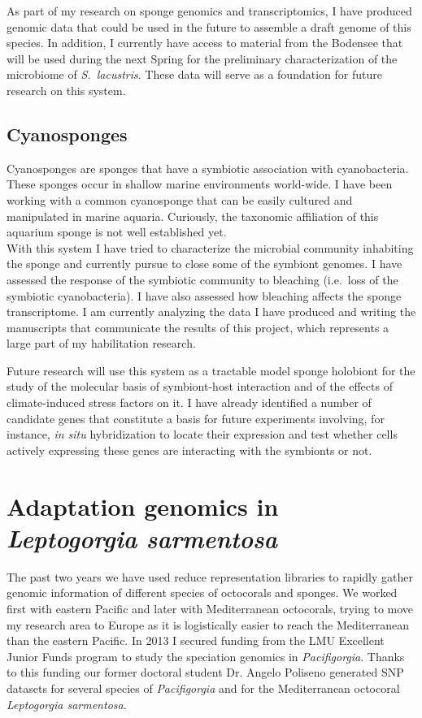 \documentclass[a4paper,11pt]{article}
\begin{document}
As part of my research on sponge genomics and transcriptomics, I have produced genomic data that could be used in the future to assemble a draft genome of this species. In addition, I currently have access to material from the Bodensee that will be used during the next Spring for the preliminary characterization of the microbiome of \emph{S.~lacustris}. These data will serve as a foundation for future research on this system.

\subsection*{Cyanosponges}

Cyanosponges are sponges that have a symbiotic association with cyanobacteria. These sponges occur in shallow marine environments world-wide. I have been working with a common cyanosponge that can be easily cultured and manipulated in marine aquaria. Curiously, the taxonomic affiliation of this aquarium sponge is not well established yet.\\

With this system I have tried to characterize the microbial community inhabiting the sponge and currently pursue to close some of the symbiont genomes. I have assessed the response of the symbiotic community to bleaching (i.e.~loss of the symbiotic cyanobacteria). I have also assessed how bleaching affects the sponge transcriptome. I am currently analyzing the data I have produced and writing the manuscripts that communicate the results of this project, which represents a large part of my habilitation research.

Future research will use this system as a tractable model sponge holobiont for the study of the molecular basis of symbiont-host interaction and of the effects of climate-induced stress factors on it. I have already identified a number of candidate genes that constitute a basis for future experiments involving, for instance, \emph{in situ} hybridization to locate their expression and test whether cells actively expressing these genes are interacting with the symbionts or not.

\section*{Adaptation genomics in \emph{Leptogorgia sarmentosa}}

The past two years we have used reduce representation libraries to rapidly gather genomic information of different species of octocorals and sponges. We worked first with eastern Pacific and later with Mediterranean octocorals, trying to move my research area to Europe as it is logistically easier to reach the Mediterranean than the eastern Pacific. In 2013 I secured funding from the LMU Excellent Junior Funds program to study the speciation genomics in \emph{Pacifigorgia}. Thanks to this funding our former doctoral student Dr. Angelo Poliseno generated SNP datasets for several species of \emph{Pacifigorgia} and for the Mediterranean octocoral \emph{Leptogorgia sarmentosa}.\\
\end{document}
